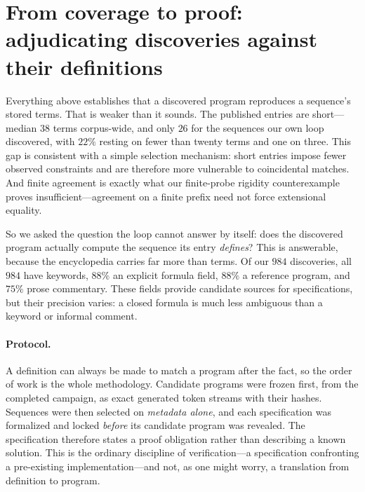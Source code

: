 \documentclass[11pt]{article}
\begin{document}
\section{From coverage to proof: adjudicating discoveries against their definitions}
\label{sec:adjudication}

Everything above establishes that a discovered program reproduces a sequence's stored
terms. That is weaker than it sounds. The published entries are short---median $38$ terms
corpus-wide, and only $26$ for the sequences our own loop discovered, with $22\%$ resting
on fewer than twenty terms and one on three. This gap is consistent with a simple
selection mechanism: short entries impose fewer observed constraints and are therefore
more vulnerable to coincidental matches. And finite agreement is exactly what our
finite-probe rigidity
counterexample proves insufficient---agreement on a finite prefix need not force
extensional equality.

So we asked the question the loop cannot answer by itself: does the discovered program
actually compute the sequence its entry \emph{defines}? This is answerable, because the
encyclopedia carries far more than terms. Of our $984$ discoveries, all $984$ have
keywords, $88\%$ an explicit formula field, $88\%$ a reference program, and $75\%$ prose
commentary. These fields provide candidate sources for specifications, but their precision
varies: a closed formula is much less ambiguous than a keyword or informal comment.

\paragraph{Protocol.} A definition can always be made to match a program after the fact,
so the order of work is the whole methodology. Candidate programs were frozen first, from
the completed campaign, as exact generated token streams with their hashes. Sequences were
then selected on \emph{metadata alone}, and each specification was formalized and locked
\emph{before} its candidate program was revealed. The specification therefore states a
proof obligation rather than describing a known solution. This is the ordinary discipline
of verification---a specification confronting a pre-existing implementation---and not, as
one might worry, a translation from definition to program.
\end{document}
